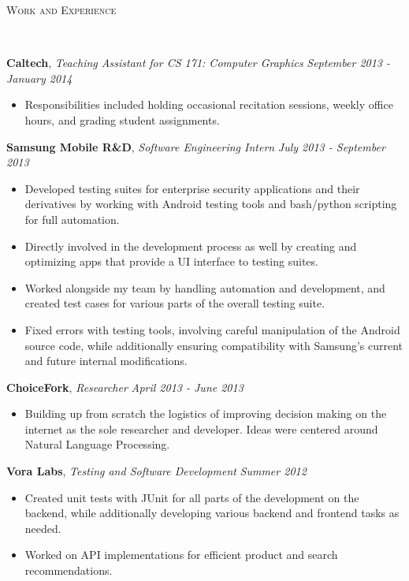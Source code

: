 \documentclass[9pt]{article}
\newenvironment{changemargin}[2]{%
  \begin{list}{}{%
    \setlength{\topsep}{0pt}%
    \setlength{\leftmargin}{#1}%
    \setlength{\rightmargin}{#2}%
    \setlength{\listparindent}{\parindent}%
    \setlength{\itemindent}{\parindent}%
    \setlength{\parsep}{\parskip}%
  }%
  \item[]}{\end{list}
}
\newcommand{\lineover}{
	\begin{changemargin}{-0.05in}{-0.05in}
		\vspace*{-8pt}
		\hrulefill \\
		\vspace*{-2pt}
	\end{changemargin}
}
\newcommand{\header}[1]{
	\begin{changemargin}{-0.5in}{-0.5in}
		\scshape{#1}\\
  	\lineover
	\end{changemargin}
}
\newenvironment{body} {
	\vspace*{-16pt}
	\begin{changemargin}{-0.25in}{-0.5in}
  }	
	{\end{changemargin}
}
\begin{document}
\header{Work and Experience}
\smallskip
\begin{body}
	\vspace{15pt}
	\textbf{Caltech}, \emph{Teaching Assistant for CS 171: Computer Graphics} \hfill \emph{September 2013 - January 2014}\\
	\vspace*{-3pt}
	\begin{itemize} \itemsep -0pt %
	\item Responsibilities included holding occasional recitation sessions, weekly office hours, and grading student assignments.
	\end{itemize}
	\textbf{Samsung Mobile R\&D}, \emph{Software Engineering Intern} \hfill \emph{July 2013 - September 2013}\\
	\vspace*{-4pt}
	\begin{itemize} \itemsep -0pt %
	\item Developed testing suites for enterprise security applications and their derivatives by working with Android testing tools and bash/python scripting for full automation.
	\item Directly involved in the development process as well by creating and optimizing apps that provide a UI interface to testing suites.
	\item Worked alongside my team by handling automation and development, and created test cases for various parts of the overall testing suite.
	\item Fixed errors with testing tools, involving careful manipulation of the Android source code, while additionally ensuring compatibility with Samsung's current and future internal modifications.
	\end{itemize}
	\textbf{ChoiceFork}, \emph{Researcher} \hfill \emph{April 2013 - June 2013}\\
	\vspace*{-4pt}
	\begin{itemize} \itemsep -0pt  %
		\item Building up from scratch the logistics of improving decision making on the internet as the sole researcher and developer. Ideas were centered around Natural Language Processing.
	\end{itemize}
\smallskip
	\textbf{Vora Labs}, \emph{Testing and Software Development} \hfill \emph{Summer 2012}\\
	\vspace*{-4pt}
	\begin{itemize} \itemsep -0pt  %
		\item Created unit tests with JUnit for all parts of the development on the backend, while additionally developing various backend and frontend tasks as needed.
		\item Worked on API implementations for efficient product and search recommendations.
	\end{itemize}
\smallskip

	
\end{body}
\end{document}

